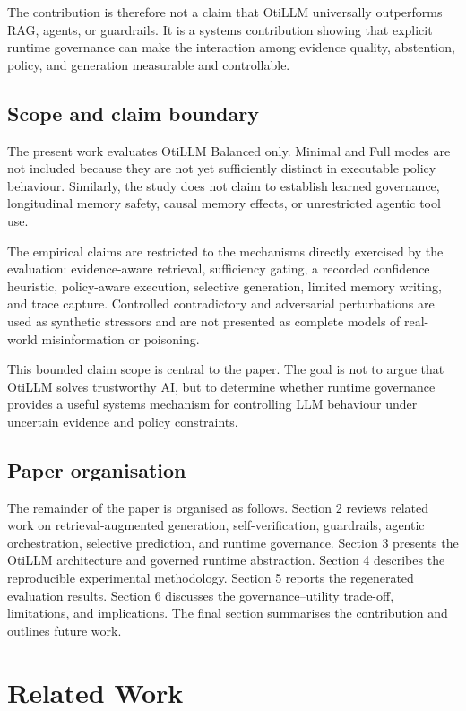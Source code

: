 \documentclass[manuscript, screen, review]{jair}
\begin{document}
The contribution is therefore not a claim that OtiLLM universally outperforms
RAG, agents, or guardrails. It is a systems contribution showing that explicit
runtime governance can make the interaction among evidence quality, abstention,
policy, and generation measurable and controllable.

\subsection{Scope and claim boundary}

The present work evaluates OtiLLM Balanced only. Minimal and Full modes are not
included because they are not yet sufficiently distinct in executable policy
behaviour. Similarly, the study does not claim to establish learned governance,
longitudinal memory safety, causal memory effects, or unrestricted agentic tool
use.

The empirical claims are restricted to the mechanisms directly exercised by
the evaluation: evidence-aware retrieval, sufficiency gating, a recorded confidence heuristic, policy-aware execution, selective generation, limited memory writing,
and trace capture. Controlled contradictory and adversarial perturbations are
used as synthetic stressors and are not presented as complete models of
real-world misinformation or poisoning.

This bounded claim scope is central to the paper. The goal is not to argue that
OtiLLM solves trustworthy AI, but to determine whether runtime governance
provides a useful systems mechanism for controlling LLM behaviour under
uncertain evidence and policy constraints.

\subsection{Paper organisation}

The remainder of the paper is organised as follows. Section 2 reviews related
work on retrieval-augmented generation, self-verification, guardrails, agentic
orchestration, selective prediction, and runtime governance. Section 3 presents
the OtiLLM architecture and governed runtime abstraction. Section 4 describes
the reproducible experimental methodology. Section 5 reports the regenerated
evaluation results. Section 6 discusses the governance–utility trade-off,
limitations, and implications. The final section summarises the contribution
and outlines future work.

\section{Related Work}
\end{document}
